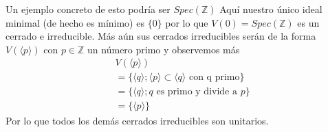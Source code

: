 \documentclass{article}
\begin{document}
\begin{ejemplo}{}{}
    Un ejemplo concreto de esto podría ser $Spec(\mathbb{Z})$
    Aquí nuestro único ideal minimal (de hecho es mínimo) es 
    $\{0\}$ por lo que $V(0) = Spec(\mathbb{Z})$ es un cerrado
    e irreducible. Más aún sus cerrados irreducibles serán de
    la forma $V(\langle p \rangle)$ con $p \in \mathbb{Z}$ un
    número primo y observemos más
    \begin{align*}
        &V(\langle p \rangle)\\ 
        &= \{\langle q \rangle; \langle p \rangle
        \subset \langle q\rangle \mbox{ con q primo}\}\\
        &=\{\langle q \rangle; q \mbox{ es primo y divide a } p\}\\
        &=\{\langle p \rangle\}
    \end{align*} 
Por lo que todos los demás cerrados irreducibles son unitarios.
\end{ejemplo}
\end{document}
